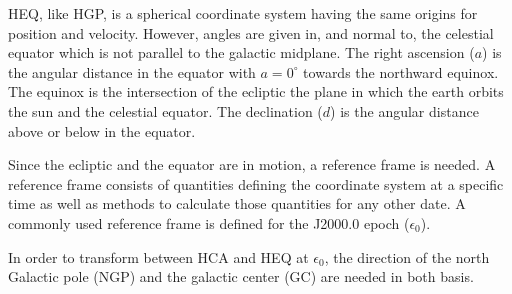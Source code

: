 \documentclass[letterpaper,10pt,english]{sphinxmanual}
\begin{document}
\sphinxAtStartPar
HEQ, like HGP, is a spherical coordinate system having the same origins for position and velocity.
However, angles are given in, and normal to, the celestial equator which is not parallel to the galactic midplane.
The right ascension (\(a\)) is the angular distance in the equator with \(a=0^{\circ}\) towards the northward equinox.
The equinox is the intersection of the ecliptic \sphinxhyphen{} the plane in which the earth orbits the sun \sphinxhyphen{} and the celestial equator.
The declination (\(d\)) is the angular distance above or below in the equator.

\sphinxAtStartPar
Since the ecliptic and the equator are in motion, a reference frame is needed.
A reference frame consists of quantities defining the coordinate system at a specific time as well as methods to
calculate those quantities for any other date. A commonly used reference frame is defined for the J2000.0 epoch (\(\epsilon_0\)).

\sphinxAtStartPar
In order to transform between HCA and HEQ at \(\epsilon_0\),
the direction of the north Galactic pole (NGP) and the galactic center (GC) are needed in both basis.
\end{document}
